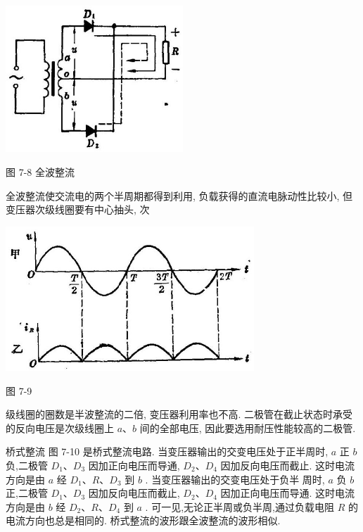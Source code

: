 \documentclass[10pt]{article}
\begin{document}
\begin{center}
\includegraphics[max width=0.5\textwidth]{images/01913056-1f15-74d8-9184-9aab52c9d66b_226_188652.jpg}
\end{center}

图 7-8 全波整流

全波整流使交流电的两个半周期都得到利用, 负载获得的直流电脉动性比较小, 但变压器次级线圈要有中心抽头, 次

\begin{center}
\includegraphics[max width=0.7\textwidth]{images/01913056-1f15-74d8-9184-9aab52c9d66b_227_169634.jpg}
\end{center}

图 7-9

级线圈的圈数是半波整流的二倍, 变压器利用率也不高. 二极管在截止状态时承受的反向电压是次级线圈上 \(a\text{、}b\) 间的全部电压, 因此要选用耐压性能较高的二极管.

桥式整流 图 7-10 是桥式整流电路. 当变压器输出的交变电压处于正半周时, \(a\) 正 \(b\) 负,二极管 \({D}_{1}\text{、}{D}_{3}\) 因加正向电压而导通, \({D}_{2}\text{、}{D}_{4}\) 因加反向电压而截止. 这时电流方向是由 \(a\) 经 \({D}_{1}\text{、}R\text{、}{D}_{3}\) 到 \(b\) . 当变压器输出的交变电压处于负半 周时, \(a\) 负 \(b\) 正,二极管 \({D}_{1}\text{、}{D}_{3}\) 因加反向电压而截止, \({D}_{2}\text{、}{D}_{4}\) 因加正向电压而导通. 这时电流方向是由 \(b\) 经 \({D}_{2}\text{、}R\text{、}{D}_{4}\) 到 \(a\) . 可一见,无论正半周或负半周,通过负载电阻 \(R\) 的电流方向也总是相同的. 桥式整流的波形跟全波整流的波形相似.
\end{document}
